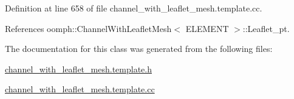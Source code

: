 Definition at line 658 of file channel\+\_\+with\+\_\+leaflet\+\_\+mesh.\+template.\+cc.



References oomph\+::\+Channel\+With\+Leaflet\+Mesh$<$ E\+L\+E\+M\+E\+N\+T $>$\+::\+Leaflet\+\_\+pt.



The documentation for this class was generated from the following files\+:\begin{DoxyCompactItemize}
\item 
\hyperlink{channel__with__leaflet__mesh_8template_8h}{channel\+\_\+with\+\_\+leaflet\+\_\+mesh.\+template.\+h}\item 
\hyperlink{channel__with__leaflet__mesh_8template_8cc}{channel\+\_\+with\+\_\+leaflet\+\_\+mesh.\+template.\+cc}\end{DoxyCompactItemize}

